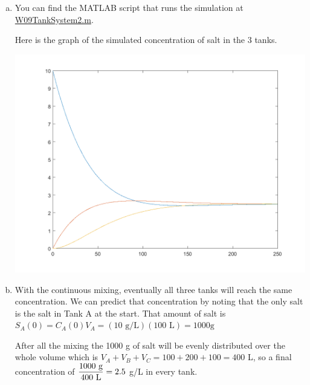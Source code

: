 \begin{enumerate}[1.]
\begin{Solution}
\begin{enumerate}[(a)]
\item You can find the MATLAB script that runs the simulation at
  \href{http://www.mast.queensu.ca/~apsc171/MNTCP01/PracticeProblems/MATLAB/W09TankSystem2.m}{W09TankSystem2.m}.

  Here is the graph of the simulated concentration of salt in the 3
  tanks.
\begin{center}
\includegraphics[width=0.65\linewidth]{graphics/Week09_TankSystems/tank_system_2a} 
\end{center}

\item With the continuous mixing, eventually all three tanks will
  reach the same concentration.  We can predict that concentration by
  noting that the only salt is the salt in Tank A at the start.  That
  amount of salt is
  $S_A(0) = C_A(0) V_A = (10 \text{ g/L})(100 \text{ L}) = 1000 \text{
    g}$

  After all the mixing the 1000 g of salt will be evenly distributed
  over the whole volume which is
  $V_A + V_B + V_C = 100 + 200 + 100 = 400$ L, so a final
  concentration of $ \displaystyle\frac{1000 \text{ g}}{400 \text{ L}} = 2.5$
  g/L in every tank.
  \end{enumerate}
\end{Solution}



\end{enumerate}


